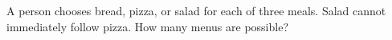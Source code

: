 A person chooses bread, pizza, or salad for each of three meals. Salad cannot immediately follow pizza. How many menus are possible?
